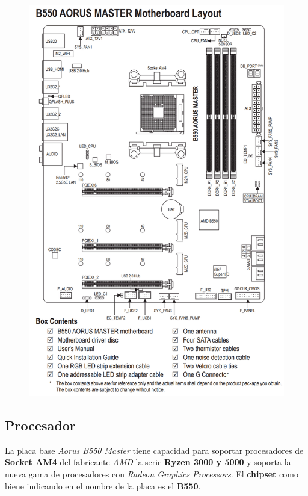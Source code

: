 \documentclass{article}
\begin{document}
  \newpage
        \begin{figure}[h]
          \centering
          \includegraphics[scale = 0.3]{img/B550AORUSMasterDiagram.png}
        \end{figure}

  \newpage

    \subsection{Procesador}
      La placa base \textit{Aorus B550 Master} tiene capacidad para soportar procesadores de \textbf{Socket AM4} del fabricante \textit{AMD} la serie \textbf{Ryzen 3000 y 5000}  y soporta la nueva gama de procesadores 
      con \textit{Radeon Graphics Processors}.
      El \textbf{chipset} como biene indicando en el nombre de la placa es el \textbf{B550}.
      
\end{document}

